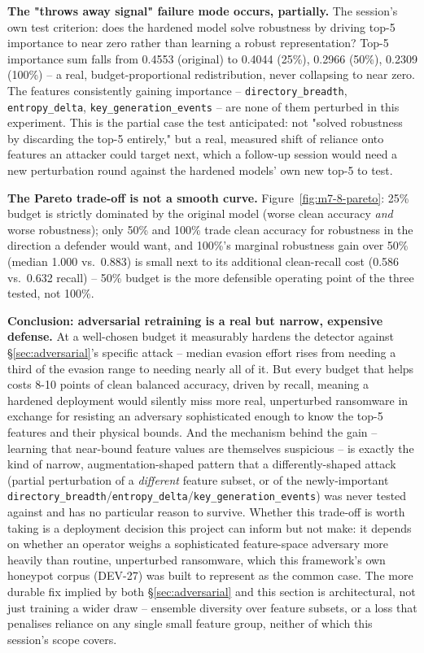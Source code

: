 \documentclass[conference]{IEEEtran}
\begin{document}
\textbf{The "throws away signal" failure mode occurs, partially.} The session's own test
criterion: does the hardened model solve robustness by driving top-5 importance to near zero
rather than learning a robust representation? Top-5 importance sum falls from 0.4553 (original)
to 0.4044 (25\%), 0.2966 (50\%), 0.2309 (100\%) -- a real, budget-proportional redistribution,
never collapsing to near zero. The features consistently gaining importance --
\texttt{directory\_breadth}, \texttt{entropy\_delta}, \texttt{key\_generation\_events} -- are none
of them perturbed in this experiment. This is the partial case the test anticipated: not
"solved robustness by discarding the top-5 entirely," but a real, measured shift of reliance onto
features an attacker could target next, which a follow-up session would need a new perturbation
round against the hardened models' own new top-5 to test.

\textbf{The Pareto trade-off is not a smooth curve.} Figure~\ref{fig:m7-8-pareto}: 25\% budget is
strictly dominated by the original model (worse clean accuracy \emph{and} worse robustness); only
50\% and 100\% trade clean accuracy for robustness in the direction a defender would want, and
100\%'s marginal robustness gain over 50\% (median 1.000 vs.\ 0.883) is small next to its
additional clean-recall cost (0.586 vs.\ 0.632 recall) -- 50\% budget is the more defensible
operating point of the three tested, not 100\%.

\textbf{Conclusion: adversarial retraining is a real but narrow, expensive defense.} At a
well-chosen budget it measurably hardens the detector against \S\ref{sec:adversarial}'s specific
attack -- median evasion effort rises from needing a third of the evasion range to needing nearly
all of it. But every budget that helps costs 8-10 points of clean balanced accuracy, driven by
recall, meaning a hardened deployment would silently miss more real, unperturbed ransomware in
exchange for resisting an adversary sophisticated enough to know the top-5 features and their
physical bounds. And the mechanism behind the gain -- learning that near-bound feature values are
themselves suspicious -- is exactly the kind of narrow, augmentation-shaped pattern that a
differently-shaped attack (partial perturbation of a \emph{different} feature subset, or of the
newly-important \texttt{directory\_breadth}/\texttt{entropy\_delta}/\texttt{key\_generation\_events})
was never tested against and has no particular reason to survive. Whether this trade-off is worth
taking is a deployment decision this project can inform but not make: it depends on whether an
operator weighs a sophisticated feature-space adversary more heavily than routine, unperturbed
ransomware, which this framework's own honeypot corpus (DEV-27) was built to represent as the
common case. The more durable fix implied by both \S\ref{sec:adversarial} and this section is
architectural, not just training a wider draw -- ensemble diversity over feature subsets, or a
loss that penalises reliance on any single small feature group, neither of which this session's
scope covers.
\end{document}
